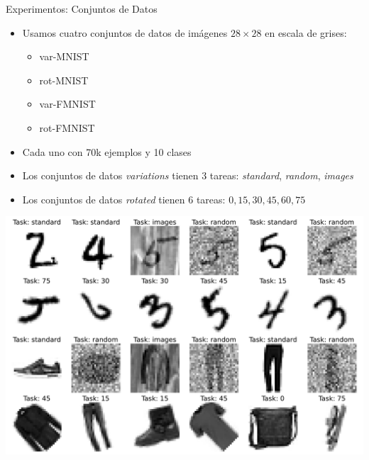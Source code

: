 \documentclass[aspectratio=43,spanish]{beamer}
\newcommand{\fdata}[1]{\textsf{#1}}
\begin{document}



\begin{frame}{Experimentos: Conjuntos de Datos}

      \begin{itemize}
          \item Usamos cuatro conjuntos de datos de imágenes $28 \times 28$ en escala de grises:
          \begin{itemize}
              \item \fdata{var-MNIST}
              \item \fdata{rot-MNIST}
              \item \fdata{var-FMNIST}
              \item \fdata{rot-FMNIST}
          \end{itemize}
          \item Cada uno con 70k ejemplos y 10 clases
          \item Los conjuntos de datos \emph{variations} tienen 3 tareas: \emph{standard}, \emph{random}, \emph{images}
          \item Los conjuntos de datos \emph{rotated} tienen 6 tareas: $0, 15, 30, 45, 60, 75$
      \end{itemize}
  
  \end{frame}

\begin{frame}
      \centering
      \includegraphics[width=.7\linewidth]{Chapter6/HAIS2022/hais22_datasets.pdf}

\end{frame}
\end{document}
